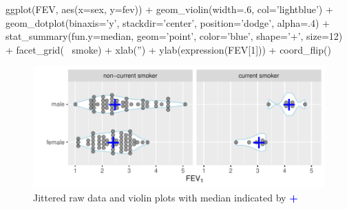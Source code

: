 \begin{Schunk}
\begin{Sinput}
ggplot(FEV, aes(x=sex, y=fev)) +
  geom_violin(width=.6, col='lightblue') +
  geom_dotplot(binaxis='y', stackdir='center', position='dodge', alpha=.4) +
  stat_summary(fun.y=median, geom='point', color='blue', shape='+', size=12) +
  facet_grid(~ smoke) +
  xlab('') + ylab(expression(FEV[1])) + coord_flip()
\end{Sinput}
\begin{figure}[htbp]

\centerline{\includegraphics{descript-vplot-1} }

\caption[Jittered raw data and violin plots with median indicated by \textbf{\textcolor{blue}{+}}]{Jittered raw data and violin plots with median indicated by \textbf{\textcolor{blue}{+}}}\label{fig:descript-vplot}
\end{figure}
\end{Schunk}

  
